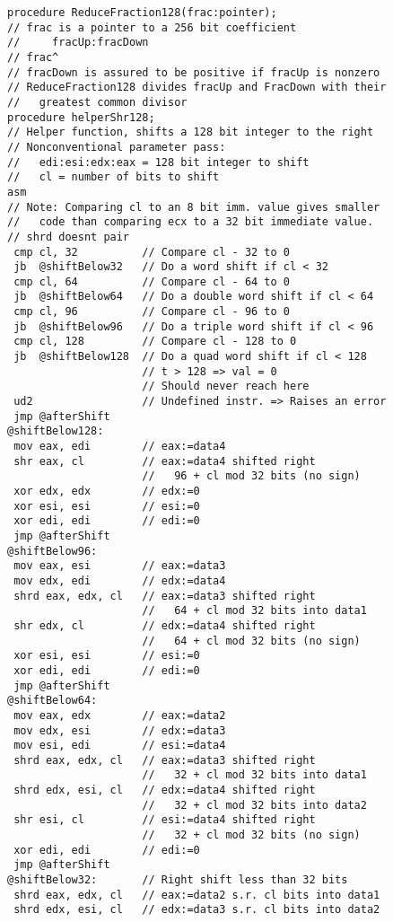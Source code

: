 \begin{multicols}{2}
{\tiny
\begin{verbatim}
procedure ReduceFraction128(frac:pointer);
// frac is a pointer to a 256 bit coefficient
//     fracUp:fracDown
// frac^
// fracDown is assured to be positive if fracUp is nonzero
// ReduceFraction128 divides fracUp and FracDown with their
//   greatest common divisor
procedure helperShr128;
// Helper function, shifts a 128 bit integer to the right
// Nonconventional parameter pass:
//   edi:esi:edx:eax = 128 bit integer to shift
//   cl = number of bits to shift
asm
// Note: Comparing cl to an 8 bit imm. value gives smaller
//   code than comparing ecx to a 32 bit immediate value.
// shrd doesnt pair
 cmp cl, 32          // Compare cl - 32 to 0
 jb  @shiftBelow32   // Do a word shift if cl < 32
 cmp cl, 64          // Compare cl - 64 to 0
 jb  @shiftBelow64   // Do a double word shift if cl < 64
 cmp cl, 96          // Compare cl - 96 to 0
 jb  @shiftBelow96   // Do a triple word shift if cl < 96
 cmp cl, 128         // Compare cl - 128 to 0
 jb  @shiftBelow128  // Do a quad word shift if cl < 128
                     // t > 128 => val = 0
                     // Should never reach here
 ud2                 // Undefined instr. => Raises an error
 jmp @afterShift
@shiftBelow128:
 mov eax, edi        // eax:=data4
 shr eax, cl         // eax:=data4 shifted right
                     //   96 + cl mod 32 bits (no sign)
 xor edx, edx        // edx:=0
 xor esi, esi        // esi:=0
 xor edi, edi        // edi:=0
 jmp @afterShift
@shiftBelow96:
 mov eax, esi        // eax:=data3
 mov edx, edi        // edx:=data4
 shrd eax, edx, cl   // eax:=data3 shifted right
                     //   64 + cl mod 32 bits into data1
 shr edx, cl         // edx:=data4 shifted right
                     //   64 + cl mod 32 bits (no sign)
 xor esi, esi        // esi:=0
 xor edi, edi        // edi:=0
 jmp @afterShift
@shiftBelow64:
 mov eax, edx        // eax:=data2
 mov edx, esi        // edx:=data3
 mov esi, edi        // esi:=data4
 shrd eax, edx, cl   // eax:=data3 shifted right
                     //   32 + cl mod 32 bits into data1
 shrd edx, esi, cl   // edx:=data4 shifted right
                     //   32 + cl mod 32 bits into data2
 shr esi, cl         // esi:=data4 shifted right
                     //   32 + cl mod 32 bits (no sign)
 xor edi, edi        // edi:=0
 jmp @afterShift
@shiftBelow32:       // Right shift less than 32 bits
 shrd eax, edx, cl   // eax:=data2 s.r. cl bits into data1
 shrd edx, esi, cl   // edx:=data3 s.r. cl bits into data2

\end{verbatim}}
\end{multicols}
